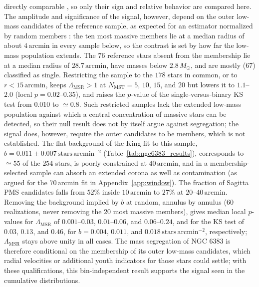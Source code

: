 \documentclass{aa}
\begin{document}
directly comparable \citep{2011MNRAS.416..541M}, so only their sign and relative behavior are compared here. The amplitude and significance of the signal, however, depend on the outer low-mass candidates of the reference sample, as expected for an estimator normalized by random members \citep{2015MNRAS.449.3381P}: the ten most massive members lie at a median radius of about $4\,\mathrm{arcmin}$ in every sample below, so the contrast is set by how far the low-mass population extends. The $76$ reference stars absent from the \citet{2024arXiv240305143H} membership lie at a median radius of $28.7\,\mathrm{arcmin}$, have masses below $2.8\,M_\odot$, and are mostly ($67$) classified as single. Restricting the sample to the $178$ stars in common, or to $r<15\,\mathrm{arcmin}$, keeps $\Lambda_{\mathrm{MSR}}>1$ at $N_{\mathrm{MST}}=5$, $10$, $15$, and $20$ but lowers it to $1.1$--$2.0$ (local $p=0.02$--$0.35$), and raises the $p$-value of the single-versus-binary KS test from $0.010$ to $\simeq0.8$. Such restricted samples lack the extended low-mass population against which a central concentration of massive stars can be detected, so their null result does not by itself argue against segregation; the signal does, however, require the outer candidates to be members, which is not established. The flat background of the King fit to this sample, $b=0.011\pm0.007\,\mathrm{stars\,arcmin^{-2}}$ (Table~\ref{tab:ngc6383_results}), corresponds to $\simeq55$ of the $254$ stars, is poorly constrained at $40\,\mathrm{arcmin}$, and in a membership-selected sample can absorb an extended corona as well as contamination (as argued for the $70\,\mathrm{arcmin}$ fit in Appendix~\ref{app:window}). The fraction of Sagitta PMS candidates falls from $52\%$ inside $10\,\mathrm{arcmin}$ to $27\%$ at $20$--$40\,\mathrm{arcmin}$. Removing the background implied by $b$ at random, annulus by annulus ($60$ realizations, never removing the $20$ most massive members), gives median local $p$-values for $\Lambda_{\mathrm{MSR}}$ of $0.001$--$0.03$, $0.01$--$0.06$, and $0.06$--$0.24$, and for the KS test of $0.03$, $0.13$, and $0.46$, for $b=0.004$, $0.011$, and $0.018\,\mathrm{stars\,arcmin^{-2}}$, respectively; $\Lambda_{\mathrm{MSR}}$ stays above unity in all cases. The mass segregation of NGC 6383 is therefore conditional on the membership of its outer low-mass candidates, which radial velocities or additional youth indicators for those stars could settle; with these qualifications, this bin-independent result supports the signal seen in the cumulative distributions.
\end{document}
